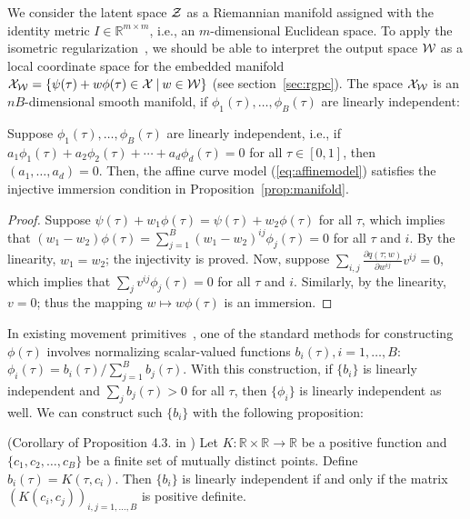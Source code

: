 We consider the latent space ${\cal Z}$ as a Riemannian manifold assigned with the identity metric $I \in \mathbb{R}^{m \times m}$, i.e., an $m$-dimensional Euclidean space. To apply the isometric regularization~\cite{yonghyeon2022regularized}, we should be able to interpret the output space ${\cal W}$ as a local coordinate space for the embedded manifold ${\cal X}_{\cal W} = \{\psi(\tau) + w\phi(\tau) \in {\cal X} \: | \: w \in {\cal W}\}$ (see section~\ref{sec:rgpc}). 
The space ${\cal X}_{\cal W}$ is an $nB$-dimensional smooth manifold, if $\phi_1(\tau), \ldots, \phi_B(\tau)$ are linearly independent:
\begin{prop}
    Suppose $\phi_1(\tau), \ldots, \phi_B(\tau)$ are linearly independent, i.e., if $a_1 \phi_1(\tau) + a_2 \phi_2(\tau) + \cdots + a_d \phi_d(\tau) = 0$ for all $\tau\in [0,1]$, then $(a_1, \ldots, a_d) = 0$. Then, the affine curve model (\ref{eq:affinemodel}) satisfies the injective immersion condition in Proposition~\ref{prop:manifold}.
\end{prop}
\begin{proof}
    Suppose $\psi(\tau) + w_1 \phi(\tau) = \psi(\tau) + w_2\phi(\tau)$ for all $\tau$, which implies that $(w_1 - w_2)\phi(\tau)=\sum_{j=1}^{B} (w_1-w_2)^{ij} \phi_j(\tau)=0$ for all $\tau$ and $i$. By the linearity, $w_1 = w_2$; the injectivity is proved. Now, suppose $\sum_{i,j} \frac{\partial q(\tau;w)}{\partial w^{ij}} v^{ij}=0$, which implies that $\sum_{j} v^{ij} \phi_j(\tau)=0$ for all $\tau$ and $i$. Similarly, by the linearity, $v=0$; thus the mapping $w \mapsto w \phi(\tau)$ is an immersion.  
\end{proof}

In existing movement primitives~\cite{paraschos2013probabilistic, zhou2019learning}, one of the standard methods for constructing $\phi(\tau)$ involves normalizing scalar-valued functions $b_i(\tau), i=1,\ldots,B$: $\phi_i(\tau) = b_i(\tau)/\sum_{j=1}^{B} b_j(\tau)$. With this construction, if $\{b_i\}$ is linearly independent and $\sum_j b_j(\tau) > 0$ for all $\tau$, then $\{\phi_i\}$ is linearly independent as well. We can construct such $\{b_i\}$ with the following proposition:
\begin{prop} (Corollary of Proposition 4.3. in \cite{paulsen2016introduction})
\label{prop:prop3}
Let $K : \mathbb{R} \times \mathbb{R} \to \mathbb{R}$ be a positive function and $\{c_1,c_2, \ldots, c_B\}$ be a finite set of mutually distinct points. Define $b_i(\tau) = K(\tau, c_i)$.
Then $\{b_i\}$ is linearly independent if and only if the matrix $(K(c_i, c_j ))_{i,j=1,...,B}$ is positive definite.
\end{prop}

